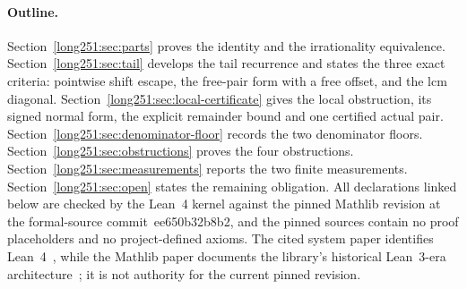 \documentclass[11pt]{article}
\renewcommand{\commitshort}{ee650b32b8b2}
\begin{document}
\paragraph{Outline.}
Section~\ref{long251:sec:parts} proves the identity and the irrationality equivalence.
Section~\ref{long251:sec:tail} develops the tail recurrence and states the three exact
criteria: pointwise shift escape, the free-pair form with a free offset, and
the lcm diagonal.  Section~\ref{long251:sec:local-certificate} gives the local
obstruction, its signed normal form, the explicit remainder bound and one
certified actual pair.  Section~\ref{long251:sec:denominator-floor} records the two
denominator floors.  Section~\ref{long251:sec:obstructions} proves the four
obstructions.  Section~\ref{long251:sec:measurements} reports the two finite
measurements.  Section~\ref{long251:sec:open} states the remaining obligation.  All
declarations linked below are checked by the Lean~4 kernel against the pinned
Mathlib revision at the formal-source commit~\commitshort, and the pinned
sources contain no proof placeholders and no project-defined axioms.  The
cited system paper identifies Lean~4~\cite[abstract and \S1,
pp.~625--626]{lean4}, while the Mathlib paper documents the library's
historical Lean~3-era architecture~\cite[abstract and \S1.1, p.~367]{mathlib};
it is not authority for the current pinned revision.

\statusboundary
\end{document}
